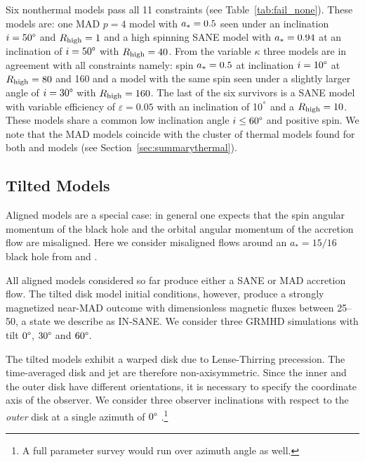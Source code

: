 

Six nonthermal models pass all 11 constraints (see Table~\ref{tab:fail_none}).
These models are:
one \hamr MAD $p=4$ model with $a_*=0.5$ seen under an inclination $i=50\degree$ and
$R_\mathrm{high}=1$ and a high spinning SANE model with $a_*=0.94$ at an inclination of $i=50\degree$ with $R_\mathrm{high}=40$.
From the \bhac variable $\kappa$ three models are in agreement with all constraints namely: spin $a_*=0.5$ at inclination $i=10\degree$ at $R_\mathrm{high}=80$ and 160 and a model with the same spin seen under a slightly larger angle of $i=30\degree$ with $R_\mathrm{high}=160$.
The last of the six survivors is a \bhac SANE model with variable efficiency of $\varepsilon=0.05$ with an inclination of 10$^\degree$ and a $R_\mathrm{high}=10$.
These models share a common low inclination angle $i \leq 60\degree$ and positive spin.
We note that the MAD models coincide with the cluster of thermal models found for both \bhac and \kharma models (see Section~\ref{sec:summarythermal}).




\subsection{Tilted Models}

Aligned models are a special case: in general one expects that the spin angular momentum of the black hole and the orbital angular momentum of the accretion flow are misaligned.
Here we consider misaligned flows around an $a_*=15/16$ black hole from \citet{Liska2018} and \citet{Chatterjee2020}.

All aligned models considered so far produce either a SANE or MAD accretion flow.
The tilted disk model initial conditions, however, produce a strongly magnetized near-MAD outcome with dimensionless magnetic fluxes between 25--50, a state we describe as  IN-SANE.
We consider three GRMHD simulations with tilt $0\degree$, $30\degree$ and $60\degree$.

The tilted models exhibit a warped disk due to  Lense-Thirring precession.
The time-averaged disk and jet are therefore non-axisymmetric.
Since the inner and the outer disk have different orientations, it is necessary to specify the coordinate axis of the observer.
We consider three  observer inclinations with respect to the {\em outer} disk at a single azimuth of $0\degree$ \citep[for more details, see][]{Chatterjee2020}.\footnote{A full parameter survey would run over azimuth angle as well.}

